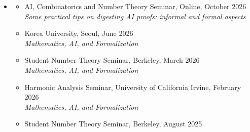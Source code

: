 \documentclass[letterpaper,11pt]{article}
\newcommand{\ressubsection}[1]{%
  \par\addvspace{4pt}{\sffamily\bfseries\color{muted}#1}\par\nobreak\vspace{2pt}}
\begin{document}
\begin{itemize}
\begin{itemize}
		{\color{muted}\textit{HETAL: Efficient Privacy-preserving Transfer Learning with Homomorphic Encryption}}
		\item School of Computing, KAIST, Daejeon, June 2023 \\
		{\color{muted}\textit{HETAL: Efficient Privacy-preserving Transfer Learning with Homomorphic Encryption}}
		\item 1st FHE.org workshop, Trondheim, May 2022 \\
		{\color{muted}\textit{Encrypted Multinomial Logistic Regression Training with Softmax Approximation}}
		\item Workshop for Young Mathematicians in Korea, Online, January 2022 \\
		{\color{muted}\textit{Hitchhiker's guide to non-archimedean world}}
		\item Graduate student seminar, Sogang University, Seoul, July 2018 \\
		{\color{muted}\textit{Maass wave forms, quantum modular forms and Hecke operators}}
		\item Sungkyunkwan University, Seoul, June 2018 \\
		{\color{muted}\textit{Maass wave forms, quantum modular forms and Hecke operators}}
		\item NCTS-POSTECH Number Theory Workshop, NTU, Taiwan, December 2017 \\
		{\color{muted}\textit{Quantum modular forms and Hecke operators}}
	\end{itemize}
	\item[] \ressubsection{Expository Talks}
	\begin{itemize}
		\item AI, Combinatorics and Number Theory Seminar, Online, October 2026 \\
		{\color{muted}\textit{Some practical tips on digesting AI proofs: informal and formal aspects}}
		\item Korea University, Seoul, June 2026 \\
		{\color{muted}\textit{Mathematics, AI, and Formalization}}
		\item Student Number Theory Seminar, Berkeley, March 2026 \\
		{\color{muted}\textit{Mathematics, AI, and Formalization}}
		\item Harmonic Analysis Seminar, University of California Irvine, February 2026 \\
		{\color{muted}\textit{Mathematics, AI, and Formalization}}
		\item Student Number Theory Seminar, Berkeley, August 2025 \\

\end{itemize}
\end{itemize}
\end{document}
